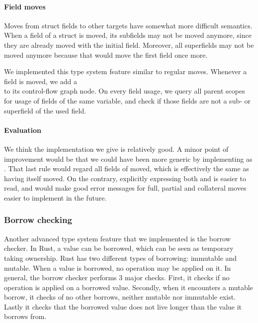 \paragraph{Field moves}

Moves from struct fields to other targets have somewhat more difficult semantics. When a field of a struct is moved, its subfields may not be moved anymore, since they are already moved with the initial field. Moreover, all superfields may not be moved anymore because that would move the first field once more. 

We implemented this type system feature similar to regular moves. Whenever a field is moved, we add a\\  to its control-flow graph node. On every field usage, we query all parent scopes for usage of fields of the same variable, and check if those fields are not a sub- or superfield of the used field.

\paragraph{Evaluation}

We think the implementation we give is relatively good. A minor point of improvement would be that we could have been more generic by implementing  as . That last rule would regard all fields of  moved, which is effectively the same as having  itself moved. On the contrary, explicitly expressing both  and  is easier to read, and would make good error messages for full, partial and collateral moves easier to implement in the future.

\subsubsection{Borrow checking}

Another advanced type system feature that we implemented is the borrow checker. In Rust, a value can be borrowed, which can be seen as temporary taking ownership. Rust has two different types of borrowing: immutable and mutable. When a value is borrowed, no operation may be applied on it.
In general, the borrow checker performs 3 major checks. First, it checks if no operation is applied on a borrowed value. Secondly, when it encounters a mutable borrow, it checks of no other borrows, neither mutable nor immutable exist. Lastly it checks that the borrowed value does not live longer than the value it borrows from.

